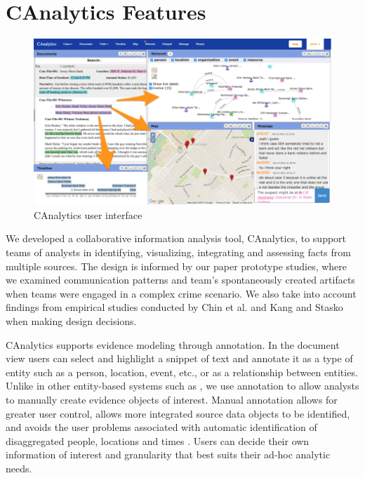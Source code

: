 
\section{CAnalytics Features}\label{canalytics-features}

\begin{figure}
\centering
\includegraphics{./img/interface.png}
\caption{CAnalytics user interface}
\end{figure}

We developed a collaborative information analysis tool, CAnalytics, to
support teams of analysts in identifying, visualizing, integrating and
assessing facts from multiple sources. The design is informed by our
paper prototype studies, where we examined communication patterns and
team's spontaneously created artifacts when teams were engaged in a
complex crime scenario. We also take into account findings from
empirical studies conducted by Chin et al. \autocite{Chin2009} and Kang
and Stasko \autocite{Kang2011} when making design decisions.

CAnalytics supports evidence modeling through annotation. In the
document view users can select and highlight a snippet of text and
annotate it as a type of entity such as a person, location, event, etc.,
or as a relationship between entities. Unlike in other entity-based
systems such as \autocites{Bier2010}{Stasko2008}, we use annotation to
allow analysts to manually create evidence objects of interest. Manual
annotation allows for greater user control, allows more integrated
source data objects to be identified, and avoids the user problems
associated with automatic identification of disaggregated people,
locations and times \autocite{Bier2008}. Users can decide their own
information of interest and granularity that best suits their ad-hoc
analytic needs.

